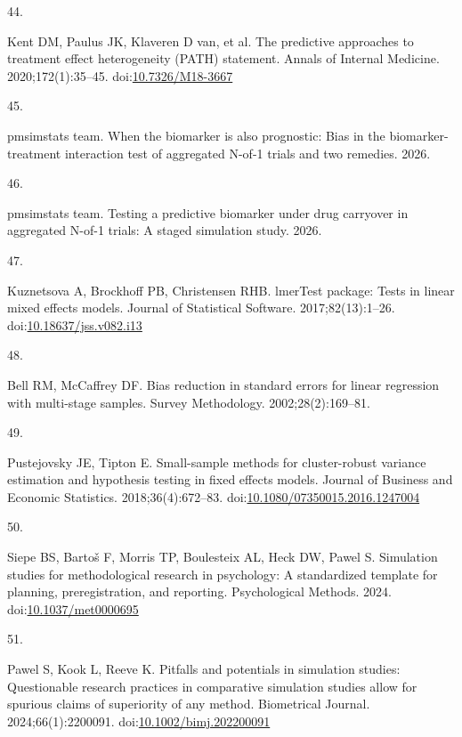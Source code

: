 \documentclass[
  11pt,
]{article}
\newlength{\cslhangindent}
\newlength{\csllabelwidth}
\newenvironment{CSLReferences}[2] %
 {\begin{list}{}{%
  \setlength{\itemindent}{0pt}
  \setlength{\leftmargin}{0pt}
  \setlength{\parsep}{0pt}
  \ifodd #1
   \setlength{\leftmargin}{\cslhangindent}
   \setlength{\itemindent}{-1\cslhangindent}
  \fi
  \setlength{\itemsep}{#2\baselineskip}}}
 {\end{list}}
\newcommand{\CSLLeftMargin}[1]{\parbox[t]{\csllabelwidth}{\strut#1\strut}}
\newcommand{\CSLRightInline}[1]{\parbox[t]{\linewidth - \csllabelwidth}{\strut#1\strut}}
\begin{document}
\begin{CSLReferences}{0}{1}
\CSLLeftMargin{44. }%
\CSLRightInline{{Kent DM, Paulus JK, Klaveren D van, et al.} The predictive approaches to treatment effect heterogeneity ({PATH}) statement. Annals of Internal Medicine. 2020;172(1):35--45. doi:\href{https://doi.org/10.7326/M18-3667}{10.7326/M18-3667}}

\CSLLeftMargin{45. }%
\CSLRightInline{{pmsimstats team}. When the biomarker is also prognostic: Bias in the biomarker-treatment interaction test of aggregated {N}-of-1 trials and two remedies. 2026.}

\CSLLeftMargin{46. }%
\CSLRightInline{{pmsimstats team}. Testing a predictive biomarker under drug carryover in aggregated {N}-of-1 trials: A staged simulation study. 2026.}

\CSLLeftMargin{47. }%
\CSLRightInline{Kuznetsova A, Brockhoff PB, Christensen RHB. {lmerTest} package: Tests in linear mixed effects models. Journal of Statistical Software. 2017;82(13):1--26. doi:\href{https://doi.org/10.18637/jss.v082.i13}{10.18637/jss.v082.i13}}

\CSLLeftMargin{48. }%
\CSLRightInline{Bell RM, McCaffrey DF. Bias reduction in standard errors for linear regression with multi-stage samples. Survey Methodology. 2002;28(2):169--81.}

\CSLLeftMargin{49. }%
\CSLRightInline{Pustejovsky JE, Tipton E. Small-sample methods for cluster-robust variance estimation and hypothesis testing in fixed effects models. Journal of Business and Economic Statistics. 2018;36(4):672--83. doi:\href{https://doi.org/10.1080/07350015.2016.1247004}{10.1080/07350015.2016.1247004}}

\CSLLeftMargin{50. }%
\CSLRightInline{Siepe BS, Bartoš F, Morris TP, Boulesteix AL, Heck DW, Pawel S. Simulation studies for methodological research in psychology: A standardized template for planning, preregistration, and reporting. Psychological Methods. 2024. doi:\href{https://doi.org/10.1037/met0000695}{10.1037/met0000695}}

\CSLLeftMargin{51. }%
\CSLRightInline{Pawel S, Kook L, Reeve K. Pitfalls and potentials in simulation studies: Questionable research practices in comparative simulation studies allow for spurious claims of superiority of any method. Biometrical Journal. 2024;66(1):2200091. doi:\href{https://doi.org/10.1002/bimj.202200091}{10.1002/bimj.202200091}}


\end{CSLReferences}
\end{document}

